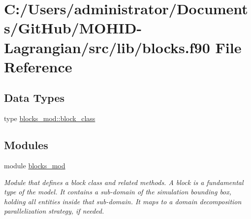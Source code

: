 \hypertarget{blocks_8f90}{}\section{C\+:/\+Users/administrator/\+Documents/\+Git\+Hub/\+M\+O\+H\+I\+D-\/\+Lagrangian/src/lib/blocks.f90 File Reference}
\label{blocks_8f90}
\subsection*{Data Types}
\begin{DoxyCompactItemize}
\item 
type \mbox{\hyperlink{structblocks__mod_1_1block__class}{blocks\+\_\+mod\+::block\+\_\+class}}
\end{DoxyCompactItemize}
\subsection*{Modules}
\begin{DoxyCompactItemize}
\item 
module \mbox{\hyperlink{namespaceblocks__mod}{blocks\+\_\+mod}}
\begin{DoxyCompactList}\small\item\em Module that defines a block class and related methods. A block is a fundamental type of the model. It contains a sub-\/domain of the simulation bounding box, holding all entities inside that sub-\/domain. It maps to a domain decomposition parallelization strategy, if needed. \end{DoxyCompactList}\end{DoxyCompactItemize}
